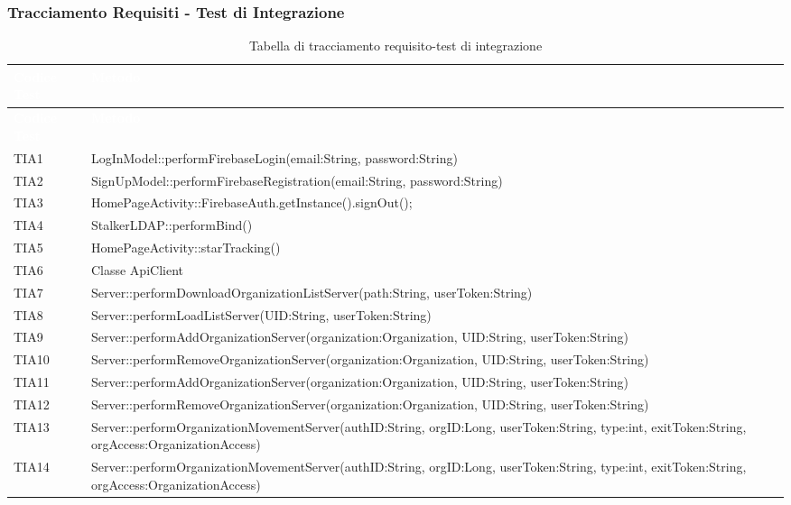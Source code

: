 \subsubsection{Tracciamento Requisiti - Test di Integrazione}
{
	\renewcommand{\arraystretch}{1.5}
	\centering
	\begin{longtable}{C{2cm} C{12cm}}
	\caption{Tabella di tracciamento requisito-test di integrazione}\\
	\textcolor{white}{\textbf{Codice Test}} & \textcolor{white}{\textbf{Metodo}}\\	
	\endfirsthead
	\textcolor{white}{\textbf{Codice Test}} & \textcolor{white}{\textbf{Metodo}}\\	
	\endhead
	
	TIA1 & LogInModel::performFirebaseLogin(email:String, password:String) \\
	TIA2 & SignUpModel::performFirebaseRegistration(email:String, password:String)\\
	TIA3 & HomePageActivity::FirebaseAuth.getInstance().signOut();\\
	TIA4 & StalkerLDAP::performBind()\\
	TIA5 & HomePageActivity::starTracking()\\
	TIA6 & Classe ApiClient\\
	TIA7 & Server::performDownloadOrganizationListServer(path:String, userToken:String)\\
	TIA8 & Server::performLoadListServer(UID:String, userToken:String) \\
	TIA9 & Server::performAddOrganizationServer(organization:Organization, UID:String, userToken:String)\\
	TIA10 & Server::performRemoveOrganizationServer(organization:Organization, UID:String, userToken:String)\\
	TIA11 & Server::performAddOrganizationServer(organization:Organization, UID:String, userToken:String)\\
	TIA12 & Server::performRemoveOrganizationServer(organization:Organization, UID:String, userToken:String)\\
	TIA13 & Server::performOrganizationMovementServer(authID:String, orgID:Long, userToken:String, type:int, exitToken:String, orgAccess:OrganizationAccess)\\
	TIA14 & Server::performOrganizationMovementServer(authID:String, orgID:Long, userToken:String, type:int, exitToken:String, orgAccess:OrganizationAccess)\\

\end{longtable}}
